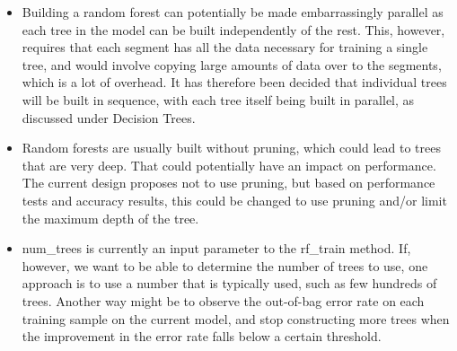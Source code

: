 \begin{itemize}
    \item Building a random forest can potentially be made embarrassingly parallel as each tree
    in the model can be built independently of the rest. This, however, requires that each segment 
    has all the data necessary for training a single tree, and would involve copying large amounts
    of data over to the segments, which is a lot of overhead. It has therefore been decided that
    individual trees will be built in sequence, with each tree itself being built in parallel, as 
    discussed under Decision Trees.
    \item Random forests are usually built without pruning, which could lead to trees that are very 
    deep. That could potentially have an impact on performance. The current design proposes 
    not to use pruning, but based on performance tests and accuracy results, this could be changed 
    to use pruning and/or limit the maximum depth of the tree.
    \item num\_trees is currently an input parameter to the rf\_train method. If, however, we want
    to be able to determine the number of trees to use, one approach is to use a number that is
    typically used, such as few hundreds of trees. Another way might be to observe the out-of-bag 
    error rate on each training sample on the current model, and stop constructing more trees when 
    the improvement in the error rate falls below a certain threshold.
\end{itemize}


